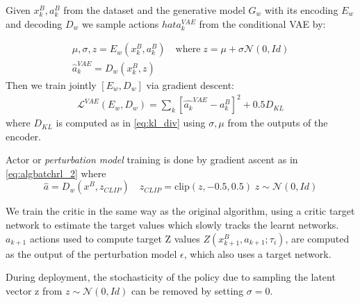 Given $x_{k}^B,a_{k}^B$ from the dataset and the generative model $G_w$ with its encoding $E_w$ and decoding $D_w$
we sample actions $hat{a}_k^{VAE}$ from the conditional VAE by:

\begin{align}
    \mu, \sigma, z = E_w(x_{k}^B,a_{k}^B) \quad \text{where} \; z=\mu + \sigma \mathcal{N}(0,Id)\\
    \hat{a}_k^{VAE} = D_w(x_{k}^B, z)
\end{align}
Then we train jointly $[E_w,D_w]$ via gradient descent:
\begin{align}
    \mathcal{L}^{VAE}(E_w,D_w)= \sum_k[\hat{a_k}^{VAE}-a_{k}^B]^2 + 0.5 D_{KL}
\end{align}
where $D_{KL}$ is computed as in \ref{eq:kl_div} using $\sigma,\mu$ from the outputs of the encoder.

Actor or \textit{perturbation model} training is done by gradient ascent as in \ref{eq:algbatchrl_2}
where 
\begin{equation}
    \hat{a} = D_w(x^B, z_{CLIP}) \quad z_{CLIP} = \text{clip}(z, -0.5,0.5) \;z \sim \mathcal{N}(0,Id)
\end{equation}

We train the critic in the same way as the original algorithm,
using a critic target network to estimate the target values 
which slowly tracks the learnt networks.
$a_{k+1}$ actions used to compute target Z values $Z(x_{k+1}^B,a_{k+1}; \tau_i)$,
are computed as the output of the perturbation model $\epsilon$, which also uses a target network.

During deployment, the stochasticity of the policy due to sampling the latent vector z from 
$z \sim \mathcal{N}(0,Id)$ can be removed by setting $\sigma=0$.



